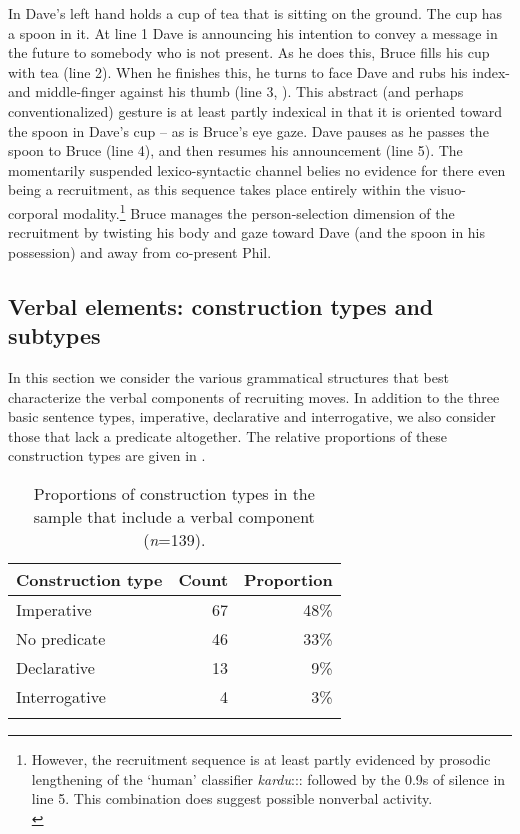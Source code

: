 \documentclass[output=paper,nonflat,colorlinks,citecolor=brown]{langsci/langscibook}
\begin{document}
In  Dave’s left hand holds a cup of tea that is sitting on the ground. The cup has a spoon in it. At line 1 Dave is announcing his intention to convey a message in the future to somebody who is not present. As he does this, Bruce fills his cup with tea (line 2). When he finishes this, he turns to face Dave and rubs his index- and middle-finger against his thumb (line 3, ). This abstract (and perhaps conventionalized) gesture is at least partly indexical in that it is oriented toward the spoon in Dave’s cup – as is Bruce’s eye gaze.  Dave pauses as he passes the spoon to Bruce (line 4), and then resumes his announcement (line 5). The momentarily suspended lexico-syntactic channel belies no evidence for there even being a recruitment, as this sequence takes place entirely within the visuo-corporal modality.\footnote{However, the recruitment sequence is at least partly evidenced by prosodic lengthening of the ‘human’ classifier \textit{kardu}::: followed by the 0.9s of  silence in line 5. This combination does suggest possible nonverbal activity.\\
} Bruce manages the person-selection dimension of the recruitment by twisting his body and gaze toward Dave (and the spoon in his possession) and away from co-present Phil.


\subsection{Verbal elements: construction types and subtypes}\label{sec:blythe:3.3}

In this section we consider the various grammatical structures that best characterize the verbal components of recruiting moves. In addition to the three basic sentence types, imperative, declarative and interrogative, we also consider those that lack a predicate altogether. The relative proportions of these construction types are given in .

\begin{table}
\begin{tabularx}{.66\textwidth}{Xrr}
\lsptoprule
Construction type & Count & Proportion\\
\midrule
Imperative & 67 & 48\%\\
No predicate & 46 & 33\%\\
Declarative & 13 & 9\%\\
Interrogative & 4 & 3\%\\
\lspbottomrule
\end{tabularx}
\caption{Proportions of construction types in the sample that include a verbal component (\textit{n}=139).}
\label{tab:blythe:2}
\end{table}
\end{document}
